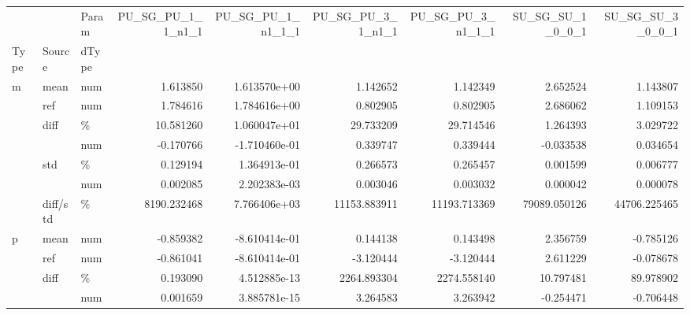 \begin{table}

\begin{tabular}{lllrrrrrr}
\toprule
   &          & Param &  PU\_SG\_PU\_1\_1\_n1\_1 &  PU\_SG\_PU\_1\_n1\_1\_1 &  PU\_SG\_PU\_3\_1\_n1\_1 &  PU\_SG\_PU\_3\_n1\_1\_1 &  SU\_SG\_SU\_1\_0\_0\_1 &  SU\_SG\_SU\_3\_0\_0\_1 \\
Type & Source & dType &                    &                    &                    &                    &                   &                   \\
\midrule
m & mean & num &           1.613850 &       1.613570e+00 &           1.142652 &           1.142349 &          2.652524 &          1.143807 \\
   & ref & num &           1.784616 &       1.784616e+00 &           0.802905 &           0.802905 &          2.686062 &          1.109153 \\
   & diff & \% &          10.581260 &       1.060047e+01 &          29.733209 &          29.714546 &          1.264393 &          3.029722 \\
   &          & num &          -0.170766 &      -1.710460e-01 &           0.339747 &           0.339444 &         -0.033538 &          0.034654 \\
   & std & \% &           0.129194 &       1.364913e-01 &           0.266573 &           0.265457 &          0.001599 &          0.006777 \\
   &          & num &           0.002085 &       2.202383e-03 &           0.003046 &           0.003032 &          0.000042 &          0.000078 \\
   & diff/std & \% &        8190.232468 &       7.766406e+03 &       11153.883911 &       11193.713369 &      79089.050126 &      44706.225465 \\
p & mean & num &          -0.859382 &      -8.610414e-01 &           0.144138 &           0.143498 &          2.356759 &         -0.785126 \\
   & ref & num &          -0.861041 &      -8.610414e-01 &          -3.120444 &          -3.120444 &          2.611229 &         -0.078678 \\
   & diff & \% &           0.193090 &       4.512885e-13 &        2264.893304 &        2274.558140 &         10.797481 &         89.978902 \\
   &          & num &           0.001659 &       3.885781e-15 &           3.264583 &           3.263942 &         -0.254471 &         -0.706448 \\

\end{tabular}
\end{table}

